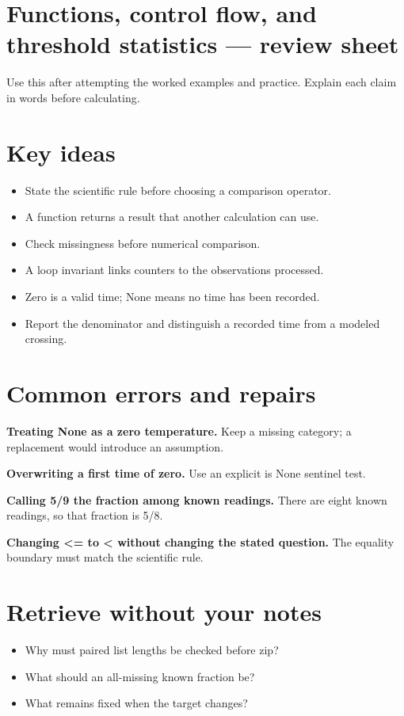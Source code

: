 \documentclass[11pt,letterpaper]{article}
\theoremstyle{definition}\newtheorem{definition}{Definition}\newtheorem{example}{Example}
\numberwithin{equation}{section}
\begin{document}
\setlength{\parskip}{4pt}
\section*{Functions, control flow, and threshold statistics --- review sheet}
Use this after attempting the worked examples and practice. Explain each claim in words before calculating.

\section*{Key ideas}
\begin{itemize}
\item State the scientific rule before choosing a comparison operator.
\item A function returns a result that another calculation can use.
\item Check missingness before numerical comparison.
\item A loop invariant links counters to the observations processed.
\item Zero is a valid time; None means no time has been recorded.
\item Report the denominator and distinguish a recorded time from a modeled crossing.
\end{itemize}
\section*{Common errors and repairs}
\textbf{Treating None as a zero temperature.} Keep a missing category; a replacement would introduce an assumption.

\textbf{Overwriting a first time of zero.} Use an explicit is None sentinel test.

\textbf{Calling 5/9 the fraction among known readings.} There are eight known readings, so that fraction is 5/8.

\textbf{Changing <=\allowbreak{} to < without changing the stated question.} The equality boundary must match the scientific rule.

\section*{Retrieve without your notes}
\begin{itemize}
\item Why must paired list lengths be checked before zip?
\item What should an all-missing known fraction be?
\item What remains fixed when the target changes?
\end{itemize}
\end{document}
